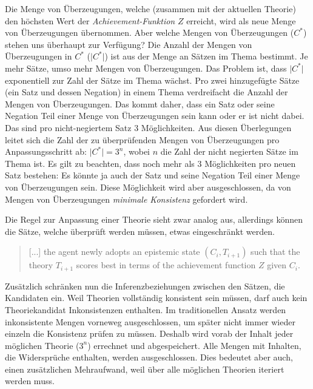 \documentclass{article}
\begin{document}
Die Menge von Überzeugungen, welche (zusammen mit der aktuellen Theorie) den höchsten Wert der \textit{Achievement-Funktion} $Z$ erreicht, wird als neue Menge von Überzeugungen übernommen. Aber welche Mengen von Überzeugungen ($C^*$) stehen uns überhaupt zur Verfügung? Die Anzahl der Mengen von Überzeugungen in $C^*$ ($\lvert C^* \lvert$) ist aus der Menge an Sätzen im Thema bestimmt. Je mehr Sätze, umso mehr Mengen von Überzeugungen. Das Problem ist, dass $\lvert C^* \lvert$ exponentiell zur Zahl der Sätze im Thema wächst. Pro zwei hinzugefügte Sätze (ein Satz und dessen Negation) in einem Thema verdreifacht die Anzahl der Mengen von Überzeugungen. Das kommt daher, dass ein Satz oder seine Negation Teil einer Menge von Überzeugungen sein kann oder er ist nicht dabei. Das sind pro nicht-negiertem Satz 3 Möglichkeiten. Aus diesen Überlegungen leitet sich die Zahl der zu überprüfenden Mengen von Überzeugungen pro Anpassungsschritt ab: $\lvert C^* \rvert = 3^n$, wobei $n$ die Zahl der nicht negierten Sätze im Thema ist. Es gilt zu beachten, dass noch mehr als 3 Möglichkeiten pro neuen Satz bestehen: Es könnte ja auch der Satz und seine Negation Teil einer Menge von Überzeugungen sein. Diese Möglichkeit wird aber ausgeschlossen, da von Mengen von Überzeugungen \textit{minimale Konsistenz} gefordert wird.

Die Regel zur Anpassung einer Theorie sieht zwar analog aus, allerdings können die Sätze, welche überprüft werden müssen, etwas eingeschränkt werden.

\begin{quote}
    [...] the agent newly adopts an epistemic state $(C_i, T_{i+1})$ such that the theory $T_{i+1}$ scores best in terms of the achievement function $Z$ given $C_i$.
    \autocite[S.~450]{beisbart_making_2021}
\end{quote}

Zusätzlich schränken nun die Inferenzbeziehungen zwischen den Sätzen, die Kandidaten ein. Weil Theorien vollständig konsistent sein müssen, darf auch kein Theoriekandidat Inkonsistenzen enthalten.
Im traditionellen Ansatz werden inkonsistente Mengen vorneweg ausgeschlossen, um später nicht immer wieder einzeln die Konsistenz prüfen zu müssen. Deshalb wird vorab der Inhalt jeder möglichen Theorie ($3^n$) errechnet und abgespeichert. Alle Mengen mit Inhalten, die Widersprüche enthalten, werden ausgeschlossen. Dies bedeutet aber auch, einen zusätzlichen Mehraufwand, weil über alle möglichen Theorien iteriert werden muss.
\end{document}
